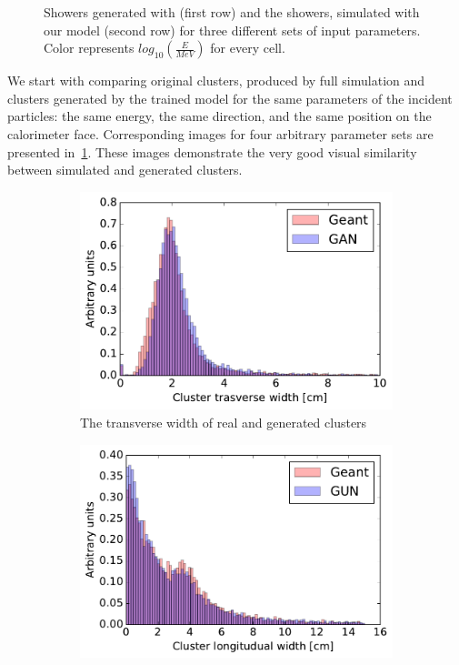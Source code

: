 \begin{figure}
  \caption{Showers generated with \geant (first row) and the showers,
    simulated with our model (second row) for three different sets of
    input parameters. Color represents $log_{10}(\frac{E}{MeV})$ for every cell.}
  \label{fig:geant_vs_ours}
\end{figure}

We start with comparing original clusters, produced by full \geant
simulation and clusters generated by the trained model for the same parameters of the incident particles: the same energy, the same direction,
 and the same position on the calorimeter face. Corresponding images
 for four arbitrary parameter sets are presented
 in~\cref{fig:geant_vs_ours}. These images demonstrate the very good visual similarity between simulated and generated clusters.


\begin{figure}
  \centering
  \begin{subfigure}[t]{0.3\textwidth}
    \centering
    \includegraphics[width=1\textwidth]{figures/width_trans.pdf}
    \caption{The transverse width of real and generated clusters}
  \end{subfigure}\hspace{0.2\textwidth}
 \begin{subfigure}[t]{0.3\textwidth}
    \centering
    \includegraphics[width=1\textwidth]{figures/width_long.pdf}

\end{subfigure}
\end{figure}
